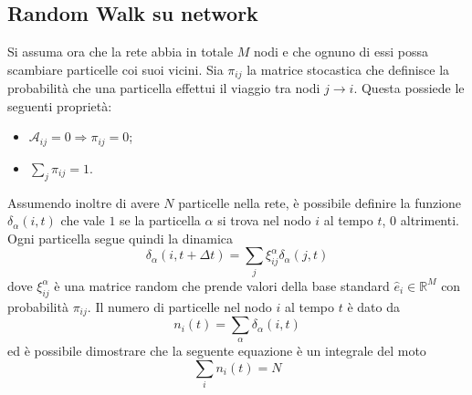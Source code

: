 \documentclass[../main.tex]{subfiles}
\begin{document}
\subsection{Random Walk su network}
Si assuma ora che la rete abbia in totale $M$ nodi e che ognuno di essi possa scambiare particelle coi suoi vicini.
Sia $\pi_{ij}$ la matrice stocastica che definisce la probabilità che una particella effettui il viaggio tra nodi $j\to i$.
Questa possiede le seguenti proprietà:
\begin{itemize}
    \item $\mathcal{A}_{ij}=0 \Longrightarrow \pi_{ij}=0$;
    \item $\sum_j\pi_{ij}=1$.
\end{itemize}
Assumendo inoltre di avere $N$ particelle nella rete, \`e possibile definire la funzione $\delta_\alpha(i,t)$ che vale $1$ se la particella $\alpha$ si trova nel nodo $i$ al tempo $t$, 0 altrimenti.
\\Ogni particella segue quindi la dinamica
\begin{equation*}
    \delta_\alpha(i,t+\Delta t)=\sum_j\xi_{ij}^\alpha\delta_\alpha(j,t)
\end{equation*}
dove $\xi_{ij}^\alpha$ \`e una matrice random che prende valori della base standard $\widehat{e}_i\in \mathbb{R}^M$ con probabilità $\pi_{ij}$.
Il numero di particelle nel nodo $i$ al tempo $t$ \`e dato da
\begin{equation*}
    n_i(t)=\sum_\alpha\delta_\alpha(i,t)
\end{equation*}
ed \`e possibile dimostrare \cite{RandomWalks} che la seguente equazione \`e un integrale del moto
\begin{equation}
    \sum_in_i(t)=N
\end{equation}
\end{document}
